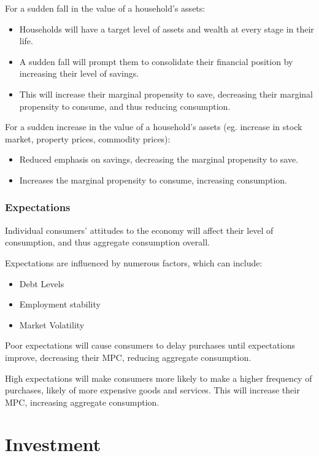 \documentclass[a4paper,11pt]{article}
\begin{document}
For a sudden fall in the value of a household's assets:

\begin{itemize}
\item Households will have a target level of assets and wealth at every stage
	in their life.
\item A sudden fall will prompt them to consolidate their financial position by
	increasing their level of savings.
\item This will increase their marginal propensity to save, decreasing their
	marginal propensity to consume, and thus reducing consumption.
\end{itemize}

For a sudden increase in the value of a household's assets (eg. increase in
stock market, property prices, commodity prices):

\begin{itemize}
\item Reduced emphasis on savings, decreasing the marginal propensity to save.
\item Increases the marginal propensity to consume, increasing consumption.
\end{itemize}


\subsubsection{Expectations}

Individual consumers' attitudes to the economy will affect their level of
consumption, and thus aggregate consumption overall.

Expectations are influenced by numerous factors, which can include:

\begin{itemize}
\item Debt Levels
\item Employment stability
\item Market Volatility
\end{itemize}

Poor expectations will cause consumers to delay purchases until expectations
improve, decreasing their MPC, reducing aggregate consumption.

High expectations will make consumers more likely to make a higher frequency of
purchases, likely of more expensive goods and services. This will increase their
MPC, increasing aggregate consumption.




\section{Investment}
\end{document}
